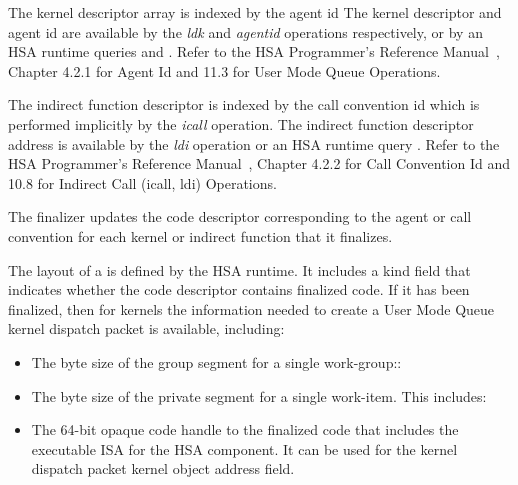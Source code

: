 \documentclass[final]{book}
\begin{document}
The kernel descriptor array is indexed by the agent id 
The kernel descriptor and agent id are available by the \emph{ldk} and \emph{agentid}
operations respectively, or by an HSA runtime queries 
and . Refer to the HSA Programmer's
Reference Manual~\cite{prm}, Chapter 4.2.1 for Agent Id and 11.3 for User Mode Queue Operations.

The indirect function descriptor is indexed by the call convention id
 which is
performed implicitly by the \emph{icall} operation. The indirect function descriptor address
is available by the \emph{ldi} operation or an HSA runtime query
. Refer to the HSA Programmer's
Reference Manual~\cite{prm}, Chapter 4.2.2 for Call Convention Id and 10.8 for
Indirect Call (icall, ldi) Operations.

The finalizer updates the code descriptor corresponding to the agent or call
convention for each kernel or indirect function that it finalizes.

The layout of a  is defined by the HSA runtime.
It includes a kind field  that indicates whether
the code descriptor contains finalized code. If it has been finalized, then for
kernels the information needed to create a User Mode Queue kernel dispatch
packet is available, including:
\begin{itemize}
\item{The byte size of the group segment for a single work-group::}
\item{The byte size of the private segment for a single work-item. This includes:}
\item{The 64-bit opaque code handle to the finalized code that includes the executable
ISA for the HSA component. It can be used for the kernel dispatch packet kernel
object address field.}
\end{itemize}
\end{document}
